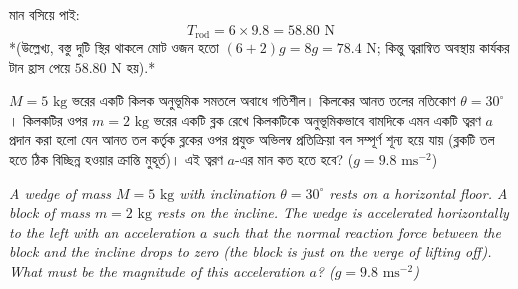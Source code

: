 \documentclass[12pt, a4paper]{article}
\begin{document}
{\begin{tcolorbox}[solutionbox={সমাধান (Solution)}]
মান বসিয়ে পাই:
\[ T_{\text{rod}} = 6 \times 9.8 = 58.80\text{ N} \]
*(উল্লেখ্য, বস্তু দুটি স্থির থাকলে মোট ওজন হতো $(6 + 2)g = 8g = 78.4\text{ N}$; কিন্তু ত্বরান্বিত অবস্থায় কার্যকর টান হ্রাস পেয়ে $58.80\text{ N}$ হয়).*
\end{tcolorbox}



\begin{tcolorbox}[questionbox={প্রশ্ন (Question) 16}]
\noindent
$M = 5\text{ kg}$ ভরের একটি কিলক অনুভূমিক সমতলে অবাধে গতিশীল। কিলকের আনত তলের নতিকোণ $\theta = 30^\circ$। কিলকটির ওপর $m = 2\text{ kg}$ ভরের একটি ব্লক রেখে কিলকটিকে অনুভূমিকভাবে বামদিকে এমন একটি ত্বরণ $a$ প্রদান করা হলো যেন আনত তল কর্তৃক ব্লকের ওপর প্রযুক্ত অভিলম্ব প্রতিক্রিয়া বল সম্পূর্ণ শূন্য হয়ে যায় (ব্লকটি তল হতে ঠিক বিচ্ছিন্ন হওয়ার ক্রান্তি মুহূর্ত)। এই ত্বরণ $a$-এর মান কত হতে হবে? ($g = 9.8\text{ ms}^{-2}$)

\vspace{0.8em}
\begin{english}
\noindent\textit{\color{darkgray}
A wedge of mass $M = 5\text{ kg}$ with inclination $\theta = 30^\circ$ rests on a horizontal floor. A block of mass $m = 2\text{ kg}$ rests on the incline. The wedge is accelerated horizontally to the left with an acceleration $a$ such that the normal reaction force between the block and the incline drops to zero (the block is just on the verge of lifting off). What must be the magnitude of this acceleration $a$? ($g = 9.8\text{ ms}^{-2}$)
}
\end{english}
\end{tcolorbox}

\vspace{1em}
\begin{center}
\end{center}}
\end{document}
